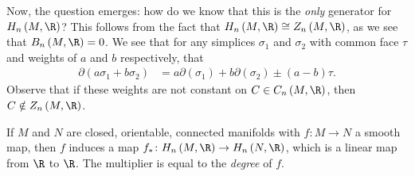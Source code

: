 \documentclass[10pt]{mypackage}
\begin{document}
Now, the question emerges: how do we know that this is the \textit{only} generator for $H_n\left( M,\R \right)$? This follows from the fact that $H_n\left( M,\R \right)\cong Z_n\left( M,\R \right)$, as we see that $B_n\left( M,\R \right) = 0$. We see that for any simplices $\sigma_1$ and $\sigma_2$ with common face $\tau$ and weights of $a$ and $b$ respectively, that
\begin{align*}
  \partial \left( a\sigma_1 + b\sigma_2 \right) &= a \partial\left( \sigma_1 \right) + b\partial\left( \sigma_2 \right) \pm \left( a-b \right)\tau.
\end{align*}
Observe that if these weights are not constant on $C\in C_n\left( M,\R \right)$, then $C\notin Z_n\left( M,\R \right)$.
\begin{definition}
  If $M$ and $N$ are closed, orientable, connected manifolds with $f\colon M\rightarrow N$ a smooth map, then $f$ induces a map $f_{\ast}\colon H_{n}\left( M,\R \right)\rightarrow H_n\left( N,\R \right)$, which is a linear map from $\R$ to $\R$. The multiplier is equal to the \textit{degree} of $f$.
\end{definition}
\end{document}
